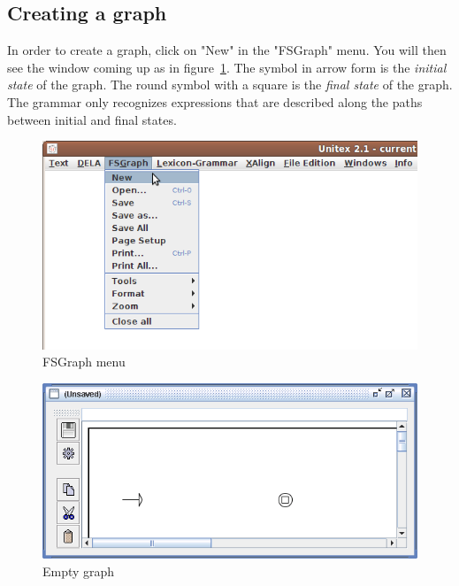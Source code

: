 \subsection{Creating a graph}
In order to create a graph, click on "New" in the "FSGraph" menu. You will then
see the window coming up as in figure~\ref{fig-new-graph}. The symbol in
arrow form is the \textit{initial state} of the graph. The
round symbol with a square is the \textit{final state} of the
graph. The grammar only recognizes expressions that are
described along the paths between initial and final states.

\begin{figure}[!h]
\begin{center}
\includegraphics[width=13cm]{resources/img/fig5-1.png}
\caption{FSGraph menu}
\end{center}
\end{figure}

\begin{figure}[!h]
\begin{center}
\includegraphics[width=14.5cm]{resources/img/fig5-2.png}
\caption{Empty graph\label{fig-new-graph}}
\end{center}
\end{figure}

